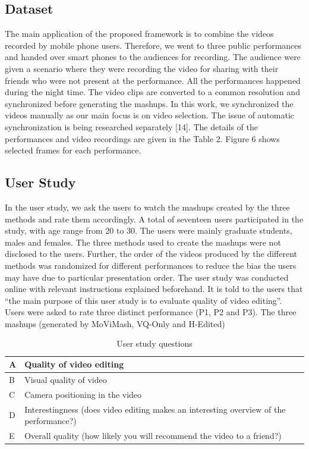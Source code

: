 \documentclass{sig-alternate}
\begin{document}
{{{\subsection{Dataset}
The main application of the proposed framework is to combine
the videos recorded by mobile phone users. Therefore, we went to
three public performances and handed over smart phones to the audiences
for recording. The audience were given a scenario where
they were recording the video for sharing with their friends who
were not present at the performance. All the performances happened
during the night time. The video clips are converted to a
common resolution and synchronized before generating the mashups.
In this work, we synchronized the videos manually as our main focus
is on video selection. The issue of automatic synchronization is
being researched separately [14]. The details of the performances
and video recordings are given in the Table 2. Figure 6 shows selected
frames for each performance.
\subsection{User Study}
In the user study, we ask the users to watch the mashups created
by the three methods and rate them accordingly. A total of seventeen
users participated in the study, with age range from 20 to 30.
The users were mainly graduate students, males and females. The
three methods used to create the mashups were not disclosed to the
users. Further, the order of the videos produced by the different
methods was randomized for different performances to reduce the
bias the users may have due to particular presentation order.
The user study was conducted online with relevant instructions
explained beforehand. It is told to the users that “the main purpose
of this user study is to evaluate quality of video editing”. Users
were asked to rate three distinct performance (P1, P2 and P3). The
three mashups (generated by MoViMash, VQ-Only and H-Edited)


\begin{table}
\centering
\caption{User study questions}
\begin{tabular}{l|l} \hline
 A & Quality of video editing\\ \hline
B &Visual quality of video\\ \hline
C &Camera positioning in the video\\ \hline
D &Interestingness (does video editing makes
an interesting
overview of the performance?)\\ \hline
E &Overall quality (how likely you will 
recommend the video to
a friend?)
\end{tabular}
\end{table}

}}}
\end{document}
